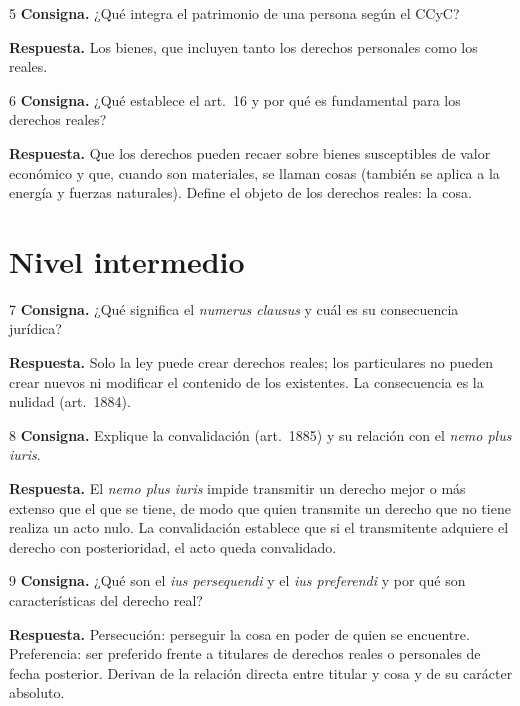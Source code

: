 \documentclass[12pt,oneside]{book}
\begin{document}
\begin{ejercicio}{5}
\textbf{Consigna.} ¿Qué integra el patrimonio de una persona según el CCyC?

\textbf{Respuesta.} Los bienes, que incluyen tanto los derechos personales como los reales.
\end{ejercicio}

\begin{ejercicio}{6}
\textbf{Consigna.} ¿Qué establece el art.~16 y por qué es fundamental para los derechos reales?

\textbf{Respuesta.} Que los derechos pueden recaer sobre bienes susceptibles de valor económico y que, cuando son materiales, se llaman cosas (también se aplica a la energía y fuerzas naturales). Define el objeto de los derechos reales: la cosa.
\end{ejercicio}

\section{Nivel intermedio}

\begin{ejercicio}{7}
\textbf{Consigna.} ¿Qué significa el \textit{numerus clausus} y cuál es su consecuencia jurídica?

\textbf{Respuesta.} Solo la ley puede crear derechos reales; los particulares no pueden crear nuevos ni modificar el contenido de los existentes. La consecuencia es la nulidad (art.~1884).
\end{ejercicio}

\begin{ejercicio}{8}
\textbf{Consigna.} Explique la convalidación (art.~1885) y su relación con el \textit{nemo plus iuris}.

\textbf{Respuesta.} El \textit{nemo plus iuris} impide transmitir un derecho mejor o más extenso que el que se tiene, de modo que quien transmite un derecho que no tiene realiza un acto nulo. La convalidación establece que si el transmitente adquiere el derecho con posterioridad, el acto queda convalidado.
\end{ejercicio}

\begin{ejercicio}{9}
\textbf{Consigna.} ¿Qué son el \textit{ius persequendi} y el \textit{ius preferendi} y por qué son características del derecho real?

\textbf{Respuesta.} Persecución: perseguir la cosa en poder de quien se encuentre. Preferencia: ser preferido frente a titulares de derechos reales o personales de fecha posterior. Derivan de la relación directa entre titular y cosa y de su carácter absoluto.
\end{ejercicio}
\end{document}
